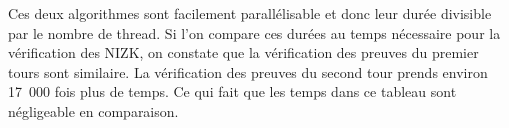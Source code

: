 \documentclass[../report]{subfiles}
\begin{document}
Ces deux algorithmes sont facilement parallélisable et donc leur durée divisible par le nombre de thread. 
Si l'on compare ces durées au temps nécessaire pour la vérification des NIZK, on constate que la vérification des 
preuves du premier tours sont similaire.
La vérification des preuves du second tour prends environ 17~000 fois plus de temps.
Ce qui fait que les temps dans ce tableau sont négligeable en comparaison.

\end{document}
